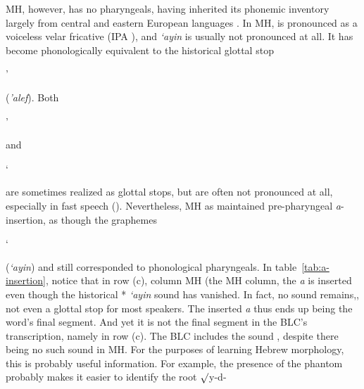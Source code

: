 \ac{MH}, however, has no pharyngeals, having inherited its phonemic inventory 
largely from central and eastern European languages \citep{montoya:2014}. In \ac{MH}, \textipa{[\textcrh]} 
is pronounced as a voiceless velar fricative (IPA \textipa{[x]}), and \textit{`ayin} 
is usually not pronounced at all. It has become phonologically 
equivalent to the historical glottal stop 
\begin{cjhebrew}'\end{cjhebrew} (\textit{'alef}). 
Both \begin{cjhebrew}'\end{cjhebrew} and \begin{cjhebrew}`\end{cjhebrew} 
are sometimes realized as glottal stops, but are often not pronounced at all, 
especially in fast speech (\citep{matras-and-schiff:2005,berman:1985}). Nevertheless,
\ac{MH} as maintained pre-pharyngeal \textit{a}-insertion, as though the graphemes 
\begin{cjhebrew}`\end{cjhebrew} (\textit{`ayin}) and \textit{}
still corresponded to phonological pharyngeals. In table~\ref{tab:a-insertion}, notice that in row (c), column \ac{MH} (the \ac{MH} column,
the \textit{a} is inserted even though the historical *\textipa{\textrevglotstop} \textit{`ayin} sound has vanished. In fact, no sound remains,,
not even a glottal stop for most speakers. The inserted \textit{a} thus ends up being the word's final segment. And yet it is not the final segment
in the \ac{BLC}'s transcription, namely  in row (c). The \ac{BLC} includes 
the sound , despite there being no such sound in \ac{MH}. 
For the purposes of learning Hebrew morphology, this is probably useful information. 
For example, the presence of the phantom  
probably makes it easier to identify the root 
$\surd$y-d-


